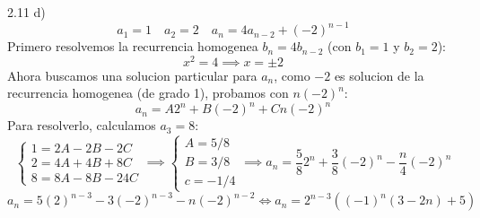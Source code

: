 \documentclass{article}
\begin{document}
2.11 d)
\[
	a_1 = 1 \quad a_2 = 2 \quad a_n = 4a_{n-2} + (-2)^{n-1}
\]
Primero resolvemos la recurrencia homogenea $b_n = 4b_{n-2}$ (con $b_1 = 1$ y $b_2 = 2$):
\[
	x^2 = 4 \implies x = \pm 2
\]
Ahora buscamos una solucion particular para $a_n$, como $-2$ es solucion de la recurrencia homogenea (de grado 1),
probamos con $n(-2)^n$:
\[
	a_n = A2^{n} + B(-2)^n + Cn(-2)^n
\]
Para resolverlo, calculamos $a_3 = 8$:
\[
	\begin{cases}
		1 = 2A -2B -2C \\
		2 = 4A + 4B +8C \\
		8 = 8A - 8B -24C
	\end{cases}
	\implies
	\begin{cases}
		A = 5/8 \\
		B = 3/8 \\
		c = -1/4
	\end{cases}
	\implies
	a_n = \frac{5}{8}2^n + \frac{3}{8}(-2)^n -\frac{n}{4}(-2)^n
\]
\[
	a_n = 5 (2)^{n-3} - 3(-2)^{n-3} - n (-2)^{n-2}
	\iff
		a_n = 2^{n-3} \left( (-1)^{n}(3 - 2n) + 5 \right)
\]
\end{document}

